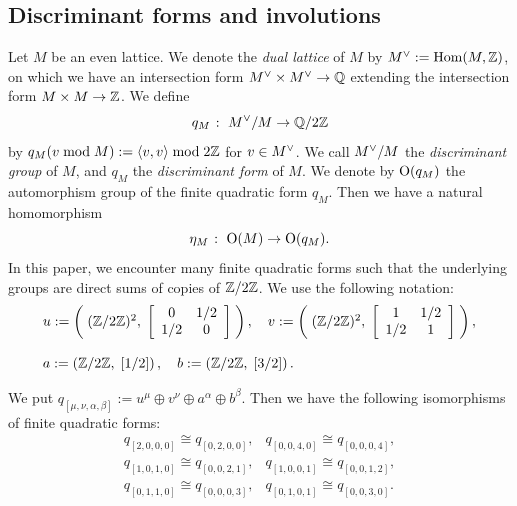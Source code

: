 \documentclass{amsart} %
\begin{document}
\subsection{Discriminant forms and involutions}\label{subsec:discfinvol}
%
\newcommand{\dLat}{M}
\newcommand{\dLatplus}{M_+}
\newcommand{\dLatminus}{M_-}
%
Let $\dLat$ be an even lattice.
We denote the \emph{dual lattice} of $\dLat$ by $\dLat\dual:=\Hom(\dLat, \ZZ)$,
on which we have 
an intersection form $\dLat\dual \times \dLat\dual \to \QQ$
extending the intersection form $\dLat \times \dLat \to \ZZ$.
We define 
\[
q_\dLat\;\colon\; \dLat\dual/\dLat \to \QQ/2\ZZ
\]
by $q_\dLat(v \bmod \dLat):=\intf{v, v} \bmod 2\ZZ$ for $v\in \dLat\dual$.
We call $\dLat\dual/\dLat$ the \emph{discriminant group} of $\dLat$,
and $q_\dLat$ the \emph{discriminant form} of $\dLat$.
We denote by $\OG(q_\dLat)$ the automorphism group of 
the finite quadratic form $q_\dLat$.
Then we have a natural homomorphism
\[
\eta_\dLat\;\colon\; \OG(\dLat) \to \OG(q_\dLat).
\]
%
In this paper,
we encounter many finite quadratic forms 
such that the underlying groups are 
direct sums of copies of $\mathord{\mathbb{Z}}/2\mathord{\mathbb{Z}}$. 
 We use the following notation:
%
\begin{equation}\label{eq:uvab}
\begin{array}{l}
u:=\left(\;(\mathord{\mathbb{Z}}/2\mathord{\mathbb{Z}})^2, \;\left[\begin{array}{cc}0&1/2 \\1/2 &0\end{array}\right]\;\right),\quad 
v:=\left(\;(\mathord{\mathbb{Z}}/2\mathord{\mathbb{Z}})^2, \;\left[\begin{array}{cc}1&1/2 \\1/2 &1\end{array}\right]\;\right),\\
\\
a:=\left(\mathord{\mathbb{Z}}/2\mathord{\mathbb{Z}}, \;\left[1/2\right]\right),\quad
b:=\left(\mathord{\mathbb{Z}}/2\mathord{\mathbb{Z}}, \;\left[3/2\right]\right).
\end{array}
\end{equation}
%
%
%
\begin{remark}\label{rem:isomqs}
We put $q_{[\mu,\nu, \alpha, \beta]}:=u^{\mu}\oplus v^{\nu} \oplus a^{\alpha}\oplus b^{\beta}$. 
Then we have the following isomorphisms of finite quadratic forms:
\[
\renewcommand{\arraystretch}{1.1}
\begin{array}{ll}
q_{[ 2, 0, 0, 0]}\cong q_{[ 0, 2, 0, 0]}, &
q_{[ 0, 0, 4, 0]}\cong q_{[ 0, 0, 0, 4]}, \\
q_{[ 1, 0, 1, 0]}\cong q_{[ 0, 0, 2, 1 ]}, &
q_{[ 1, 0, 0, 1]}\cong q_{[ 0, 0, 1, 2 ]},\\
q_{[ 0, 1, 1, 0 ]}\cong q_{[ 0, 0, 0, 3 ]}, &
q_{[ 0, 1, 0, 1 ]}\cong q_{[ 0, 0, 3, 0]}.
\end{array}
\]
\end{remark}
\end{document}
